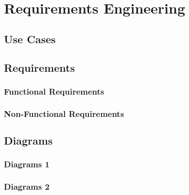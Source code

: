 \chapter{Requirements Engineering}

\section{Use Cases}

\section{Requirements}

\subsection{Functional Requirements}

\subsection{Non-Functional Requirements}

\section{Diagrams}

\subsection{Diagrams 1}

\subsection{Diagrams 2}